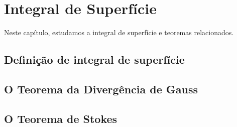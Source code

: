\chapter{Integral de Superfície}
  Neste capítulo, estudamos a integral de superfície e teoremas relacionados.
\section{Definição de integral de superfície}
\section{O Teorema da Divergência de Gauss}
\section{O Teorema de Stokes}


